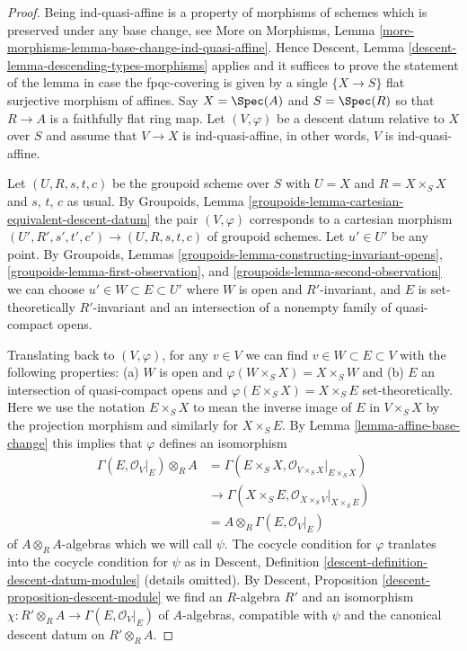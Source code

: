 \begin{proof}
Being ind-quasi-affine is a property of morphisms of schemes
which is preserved under any base change, see
More on Morphisms, Lemma
\ref{more-morphisms-lemma-base-change-ind-quasi-affine}.
Hence Descent, Lemma \ref{descent-lemma-descending-types-morphisms} applies
and it suffices to prove the statement of the lemma
in case the fpqc-covering is given by a single
$\{X \to S\}$ flat surjective morphism of affines.
Say $X = \Spec(A)$ and $S = \Spec(R)$ so
that $R \to A$ is a faithfully flat ring map.
Let $(V, \varphi)$ be a descent datum relative to $X$ over $S$
and assume that $V \to X$ is ind-quasi-affine, in other words,
$V$ is ind-quasi-affine.

\medskip\noindent
Let $(U, R, s, t, c)$ be the groupoid scheme over $S$ with
$U = X$ and $R = X \times_S X$ and $s$, $t$, $c$ as usual.
By Groupoids, Lemma \ref{groupoids-lemma-cartesian-equivalent-descent-datum}
the pair $(V, \varphi)$ corresponds to a cartesian morphism
$(U', R', s', t', c') \to (U, R, s, t, c)$ of groupoid schemes.
Let $u' \in U'$ be any point. By
Groupoids, Lemmas \ref{groupoids-lemma-constructing-invariant-opens},
\ref{groupoids-lemma-first-observation}, and
\ref{groupoids-lemma-second-observation}
we can choose $u' \in W \subset E \subset U'$
where $W$ is open and $R'$-invariant, and
$E$ is set-theoretically $R'$-invariant and
an intersection of a nonempty family of quasi-compact opens.

\medskip\noindent
Translating back to $(V, \varphi)$, for any $v \in V$ we can find
$v \in W \subset E \subset V$ with the following properties:
(a) $W$ is open and $\varphi(W \times_S X) = X \times_S W$ and
(b) $E$ an intersection of quasi-compact opens and
$\varphi(E \times_S X) = X \times_S E$ set-theoretically.
Here we use the notation $E \times_S X$ to mean the
inverse image of $E$ in $V \times_S X$ by the projection morphism and
similarly for $X \times_S E$. By Lemma \ref{lemma-affine-base-change}
this implies that $\varphi$ defines an isomorphism
\begin{align*}
\Gamma(E, \mathcal{O}_V|_E) \otimes_R A
& =
\Gamma(E \times_S X, \mathcal{O}_{V \times_S X}|_{E \times_S X}) \\
& \to
\Gamma(X \times_S E, \mathcal{O}_{X \times_S V}|_{X \times_S E}) \\
& =
A \otimes_R \Gamma(E, \mathcal{O}_V|_E)
\end{align*}
of $A \otimes_R A$-algebras which we will call $\psi$.
The cocycle condition for $\varphi$
tranlates into the cocycle condition for $\psi$ as in
Descent, Definition \ref{descent-definition-descent-datum-modules}
(details omitted). By Descent, Proposition
\ref{descent-proposition-descent-module}
we find an $R$-algebra $R'$ and an isomorphism
$\chi : R' \otimes_R A \to \Gamma(E, \mathcal{O}_V|_E)$
of $A$-algebras, compatible with $\psi$ and the
canonical descent datum on $R' \otimes_R A$.


\end{proof}
